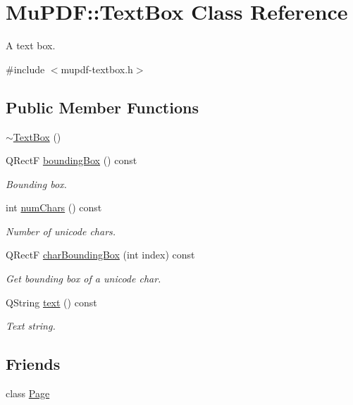 \hypertarget{class_mu_p_d_f_1_1_text_box}{\section{Mu\-P\-D\-F\-:\-:Text\-Box Class Reference}
\label{class_mu_p_d_f_1_1_text_box}
}


A text box.  




{\ttfamily \#include $<$mupdf-\/textbox.\-h$>$}

\subsection*{Public Member Functions}
\begin{DoxyCompactItemize}
\item 
\hyperlink{class_mu_p_d_f_1_1_text_box_a820ac00b0ece07e332ac7c9fc75abb54}{$\sim$\-Text\-Box} ()
\item 
Q\-Rect\-F \hyperlink{class_mu_p_d_f_1_1_text_box_a2aac0cacaafdc85f1b7c196b1449c55b}{bounding\-Box} () const 
\begin{DoxyCompactList}\small\item\em Bounding box. \end{DoxyCompactList}\item 
int \hyperlink{class_mu_p_d_f_1_1_text_box_a4d4cdc8930cf188bc3b9d201d019a987}{num\-Chars} () const 
\begin{DoxyCompactList}\small\item\em Number of unicode chars. \end{DoxyCompactList}\item 
Q\-Rect\-F \hyperlink{class_mu_p_d_f_1_1_text_box_a4ecbb3b0ca1a189468e3f1160920400a}{char\-Bounding\-Box} (int index) const 
\begin{DoxyCompactList}\small\item\em Get bounding box of a unicode char. \end{DoxyCompactList}\item 
Q\-String \hyperlink{class_mu_p_d_f_1_1_text_box_a5d3c1f7ab3488c832ac97d22fec8a62d}{text} () const 
\begin{DoxyCompactList}\small\item\em Text string. \end{DoxyCompactList}\end{DoxyCompactItemize}
\subsection*{Friends}
\begin{DoxyCompactItemize}
\item 
class \hyperlink{class_mu_p_d_f_1_1_text_box_a66d145c56e1747e0aecb5309042ab183}{Page}
\end{DoxyCompactItemize}


